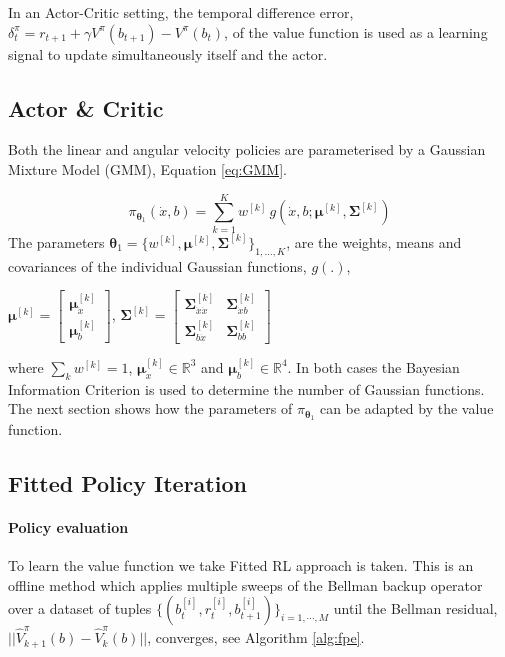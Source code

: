 \documentclass[final,5p,times,twocolumn]{elsarticle}
\newcommand{\B}{b}
\newcommand{\U}{\dot{x}}
\newcommand{\Bi}{b^{[i]}}
\newcommand{\SigK}{\boldsymbol{\Sigma}^{[k]}}
\newcommand{\MuK}{\boldsymbol{\mu}^{[k]}}
\newcommand{\piK}{w^{[k]}}
\newcommand{\Param}{\boldsymbol{\theta}}
\begin{document}
In an Actor-Critic setting, the temporal difference error, ${\delta^{\pi}_t = r_{t+1} + \gamma V^{\pi}(b_{t+1}) - V^{\pi}(b_t)}$, of the value 
function is used as a learning signal to update simultaneously itself and the actor.

\subsection{Actor \& Critic}
Both the linear and angular velocity policies are parameterised by a Gaussian Mixture Model (GMM), Equation \ref{eq:GMM}.

\begin{equation}
 \pi_{\Param_1}(\U,\B) = \sum\limits_{k=1}^{K} \piK \, g(\U,\B;\MuK,\SigK) \label{eq:GMM}
\end{equation}
The parameters $\Param_1 = \{w^{[k]},\MuK,\SigK\}_{1,\dots,K}$, are the weights, means and covariances 
of the individual Gaussian functions, $g(.)$,
\begin{center}
$\MuK =  \begin{bmatrix} \MuK_{\U} \\ \MuK_{\B} \end{bmatrix}$, 
$\SigK =  \begin{bmatrix} 
	  \SigK_{\U\U} & \SigK_{\U\B} \\
	  \SigK_{\B\U} & \SigK_{\B\B}
	  \end{bmatrix}$
\end{center}
where $\sum_{k} w^{[k]} = 1$, $\MuK_{\U} \in \mathbb{R}^{3}$ and  $\MuK_{\B} \in \mathbb{R}^{4}$.
In both cases the Bayesian Information Criterion is used to determine the number of Gaussian functions.
The next section shows how the parameters of $\pi_{\Param_1}$ can be adapted by the value function.

\subsection{Fitted Policy Iteration}\label{sec:FPI}

\paragraph{Policy evaluation}

To learn the value function we take Fitted RL \cite{EGW05} approach is taken. This is an 
offline method which applies multiple sweeps of the Bellman backup operator 
over a dataset of tuples $\{(\Bi_t,r^{[i]}_{t},\Bi_{t+1})\}_{i=1,\cdots,M}$ until the Bellman residual,
$||\hat{V}^{\pi}_{k+1}(\B) - \hat{V}^{\pi}_{k}(\B)||$, converges, see Algorithm \ref{alg:fpe}.
\end{document}

